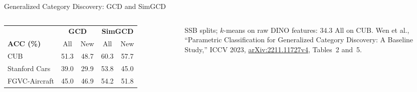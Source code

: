\begin{frame}{Generalized Category Discovery: GCD and SimGCD}
\begin{columns}[T,onlytextwidth]
      \vspace{0.4em}
      {\scriptsize
      \setlength{\tabcolsep}{3.5pt}
      \begin{tabular}{lcccc}
        \toprule
         & \multicolumn{2}{c}{\textbf{GCD}} & \multicolumn{2}{c}{\textbf{SimGCD}} \\
        \cmidrule(lr){2-3}\cmidrule(lr){4-5}
        \textbf{ACC (\%)} & All & New & All & New \\
        \midrule
        CUB & 51.3 & 48.7 & 60.3 & 57.7 \\
        Stanford Cars & 39.0 & 29.9 & 53.8 & 45.0 \\
        FGVC-Aircraft & 45.0 & 46.9 & 54.2 & 51.8 \\
        \bottomrule
      \end{tabular}\par}
      \vspace{0.2em}
      {\scriptsize SSB splits; $k$-means on raw DINO features: 34.3 All on CUB. Wen et al., ``Parametric Classification for Generalized Category Discovery: A Baseline Study,'' ICCV 2023, \href{https://arxiv.org/abs/2211.11727v4}{arXiv:2211.11727v4}, Tables~2 and~5.\par}
  \end{columns}
\end{frame}


